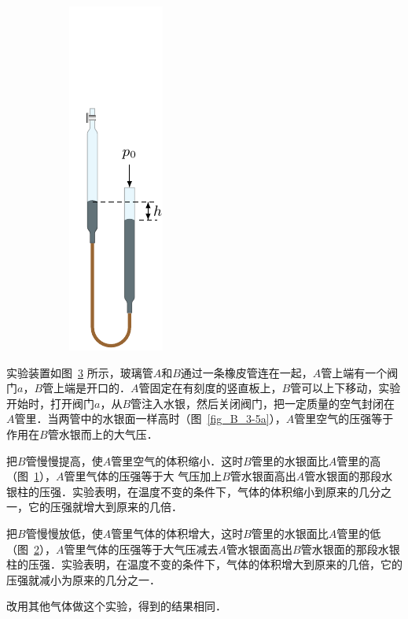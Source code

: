 \begin{figure}[htbp]
\begin{subfigure}{0.3\linewidth}
        \caption{}\label{fig_B_3-5b}
    \end{subfigure}
    \hfil
    \begin{subfigure}{0.3\linewidth}
        \centering
        \includegraphics{fig/B/3-5c.pdf}
        \caption{}\label{fig_B_3-5c}
    \end{subfigure}
    \caption{}\label{fig_B_3-5}
\end{figure}

实验装置如图~\ref{fig_B_3-5} 所示，玻璃管$A$和$B$通过一条橡皮管连在一起，$A$管上端有一个阀门$a$，$B$管上端是开口的．$A$管固定在有刻度的竖直板上，$B$管可以上下移动，实验开始时，打开阀门$a$，从$B$管注入水银，然后关闭阀门，把一定质量的空气封闭在$A$管里．当两管中的水银面一样高时（图~\ref{fig_B_3-5a}），$A$管里空气的压强等于作用在$B$管水银而上的大气压．

把$B$管慢慢提高，使$A$管里空气的体积缩小．这时$B$管里的水银面比$A$管里的高（图~\ref{fig_B_3-5b}），$A$管里气体的压强等于大
气压加上$B$管水银面高出$A$管水银面的那段水银柱的压强．实验表明，在温度不变的条件下，气体的体积缩小到原来的几分之一，它的压强就增大到原来的几倍．

把$B$管慢慢放低，使$A$管里气体的体积增大，这时$B$管里的水银面比$A$管里的低（图~\ref{fig_B_3-5c}），$A$管里气体的压强等于大气压减去$A$管水银面高出$B$管水银面的那段水银柱的压强．实验表明，在温度不变的条件下，气体的体积增大到原来的几倍，它的压强就减小为原来的几分之一．

改用其他气体做这个实验，得到的结果相同．

